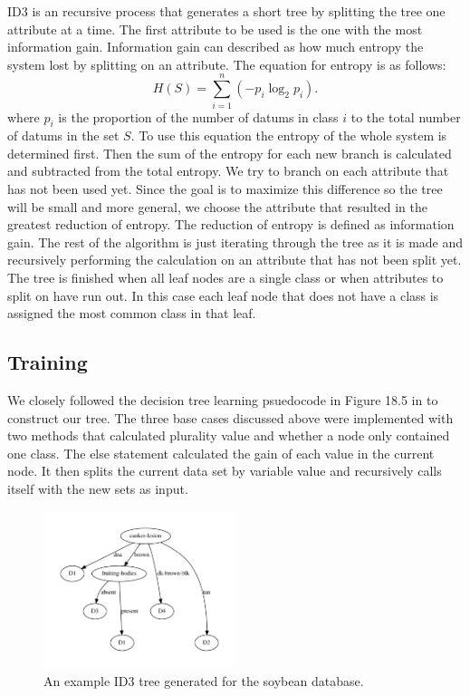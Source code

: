 \documentclass{article}
\begin{document}
	 ID3 is an recursive process that generates a short tree by splitting the tree one attribute at a time. 
	 The first attribute to be used is the one with the most information gain. 
	 Information gain can described as how much entropy the system lost by splitting on an attribute. 
	 The equation for entropy is as follows:
	 \begin{equation*}
	 H(S) = \sum_{i=1}^{n} \left( -p_i \log_2 p_i \right). 
	 \end{equation*}		
	 where $p_i$ is the proportion of the number of datums in class $i$ to the total number of datums in the set $S$. 
	 To use this equation the entropy of the whole system is determined first. 
	 Then the sum of the entropy for each new branch is calculated and subtracted from the total entropy. We try to branch on each attribute that has not been used yet. Since the goal is to maximize this difference so the tree will be small and more general, we choose the attribute that resulted in the greatest reduction of entropy. The reduction of entropy is defined as information gain.
	 The rest of the algorithm is just iterating through the tree as it is made and recursively performing the calculation on an attribute that has not been split yet. 
	 The tree is finished when all leaf nodes are a single class or when attributes to split on have run out.
	 In this case each leaf node that does not have a class is assigned the most common class in that leaf.
\subsection{Training}

	
		We closely followed the decision tree learning psuedocode in Figure 18.5 in \cite{ai} to construct our tree. The three base cases discussed above were implemented with two methods that calculated plurality value and whether a node only contained one class. The else statement calculated the gain of each value in the current node. It then splits the current data set by variable value and recursively calls itself with the new sets as input. 
	\begin{figure}[h]
		\centering
		\includegraphics[width=0.5\textwidth]{figs/ID3/soybean}
		\caption{An example ID3 tree generated for the soybean database.}
		\label{tan}
	\end{figure}
	
\end{document}
